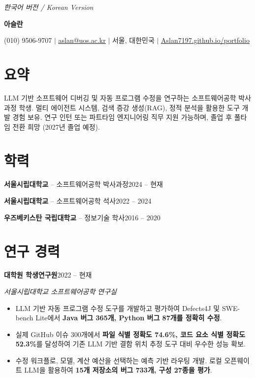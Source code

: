 \documentclass[letterpaper,11pt]{article}
\makeatletter
\newcommand{\cvHeader}[3]{%
  {\centering
    {\footnotesize\textit{#1}\par}
    \vspace{1pt}
    {\Large\textbf{#2}\par}
    \vspace{1pt}
    (010) 9506-9707 $|$ \href{mailto:aslan@uos.ac.kr}{\underline{aslan@uos.ac.kr}} $|$ #3 $|$
    \href{https://Aslan7197.github.io/portfolio}{\underline{Aslan7197.github.io/portfolio}}\par
  }
  \vspace{3pt}
}
\newcommand{\educationEntry}[3]{\textbf{#1} -- #2\hfill #3\par}
\makeatother
\begin{document}
\small
\cvHeader{한국어 버전 / Korean Version}{아슬란}{서울, 대한민국}

\section{요약}
LLM 기반 소프트웨어 디버깅 및 자동 프로그램 수정을 연구하는 소프트웨어공학 박사과정 학생. 멀티 에이전트 시스템, 검색 증강 생성(RAG), 정적 분석을 활용한 도구 개발 경험 보유. 연구 인턴 또는 파트타임 엔지니어링 직무 지원 가능하며, 졸업 후 풀타임 전환 희망 (2027년 졸업 예정).

\section{학력}
\educationEntry{서울시립대학교}{소프트웨어공학 박사과정}{2024 -- 현재}
\educationEntry{서울시립대학교}{소프트웨어공학 석사}{2022 -- 2024}
\educationEntry{우즈베키스탄 국립대학교}{정보기술 학사}{2016 -- 2020}

\section{연구 경력}
\textbf{대학원 학생연구원}\hfill 2022 -- 현재\par
\textit{서울시립대학교 소프트웨어공학 연구실}
\begin{itemize}
  \item LLM 기반 자동 프로그램 수정 도구를 개발하고 평가하여 Defects4J 및 SWE-bench Lite에서 \textbf{Java 버그 365개, Python 버그 87개를 정확히 수정}.
  \item 실제 GitHub 이슈 300개에서 \textbf{파일 식별 정확도 74.6\%, 코드 요소 식별 정확도 52.3\%}를 달성하여 기존 LLM 기반 결함 위치 추정 도구 대비 우수한 성능 확보.
  \item 수정 워크플로, 모델, 계산 예산을 선택하는 예측 기반 라우팅 개발. 로컬 오픈웨이트 LLM을 활용하여 \textbf{15개 저장소의 버그 733개, 구성 27종을 평가}.
\end{itemize}
\end{document}
